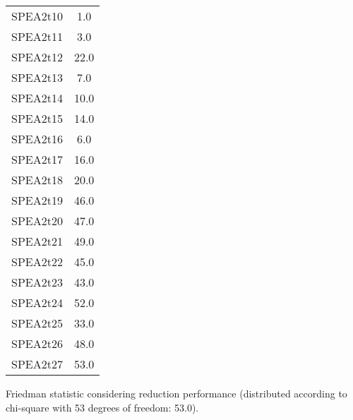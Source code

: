 \documentclass{article}
\begin{document}
\begin{table}[!htp]
\begin{tabular}{c|c}
SPEA2t10&1.0\\
SPEA2t11&3.0\\
SPEA2t12&22.0\\
SPEA2t13&7.0\\
SPEA2t14&10.0\\
SPEA2t15&14.0\\
SPEA2t16&6.0\\
SPEA2t17&16.0\\
SPEA2t18&20.0\\
SPEA2t19&46.0\\
SPEA2t20&47.0\\
SPEA2t21&49.0\\
SPEA2t22&45.0\\
SPEA2t23&43.0\\
SPEA2t24&52.0\\
SPEA2t25&33.0\\
SPEA2t26&48.0\\
SPEA2t27&53.0\\
\end{tabular}
\end{table}


Friedman statistic considering reduction performance (distributed according to chi-square with 53 degrees of freedom: 53.0).
\end{document}
